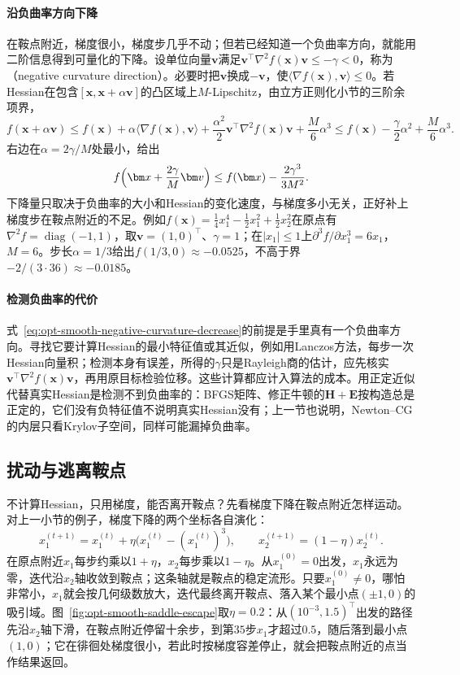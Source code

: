 \paragraph{沿负曲率方向下降}
在鞍点附近，梯度很小，梯度步几乎不动；但若已经知道一个负曲率方向，就能用二阶信息得到可量化的下降。设单位向量$\bm v$满足$\bm v^\top\nabla^2f(\bm x)\bm v\leq-\gamma<0$，称为（negative curvature direction）。必要时把$\bm v$换成$-\bm v$，使$\langle\nabla f(\bm x),\bm v\rangle\leq0$。若Hessian在包含$[\bm x,\bm x+\alpha\bm v]$的凸区域上$M$-Lipschitz，由立方正则化小节的三阶余项界，
\[
  f(\bm x+\alpha\bm v)\leq f(\bm x)+\alpha\langle\nabla f(\bm x),\bm v\rangle+\frac{\alpha^2}2\bm v^\top\nabla^2f(\bm x)\bm v+\frac M6\alpha^3
  \leq f(\bm x)-\frac\gamma2\alpha^2+\frac M6\alpha^3 .
\]
右边在$\alpha=2\gamma/M$处最小，给出
\begin{equation}
\label{eq:opt-smooth-negative-curvature-decrease}
  f\Bigl(\bm x+\frac{2\gamma}M\bm v\Bigr)\leq f(\bm x)-\frac{2\gamma^3}{3M^2}.
\end{equation}
下降量只取决于负曲率的大小和Hessian的变化速度，与梯度多小无关，正好补上梯度步在鞍点附近的不足。例如$f(\bm x)=\tfrac14x_1^4-\tfrac12x_1^2+\tfrac12x_2^2$在原点有$\nabla^2f=\operatorname{diag}(-1,1)$，取$\bm v=(1,0)^\top$、$\gamma=1$；在$|x_1|\leq1$上$\partial^3f/\partial x_1^3=6x_1$，$M=6$。步长$\alpha=1/3$给出$f(1/3,0)\approx-0.0525$，不高于界$-2/(3\cdot36)\approx-0.0185$。

\paragraph{检测负曲率的代价}
式~\eqref{eq:opt-smooth-negative-curvature-decrease}的前提是手里真有一个负曲率方向。寻找它要计算Hessian的最小特征值或其近似，例如用Lanczos方法，每步一次Hessian向量积；检测本身有误差，所得的$\gamma$只是Rayleigh商的估计，应先核实$\bm v^\top\nabla^2f(\bm x)\bm v$，再用原目标检验位移。这些计算都应计入算法的成本。用正定近似代替真实Hessian是检测不到负曲率的：BFGS矩阵、修正牛顿的$\bm H+\bm E$按构造总是正定的，它们没有负特征值不说明真实Hessian没有；上一节也说明，Newton--CG的内层只看Krylov子空间，同样可能漏掉负曲率。

\subsection{扰动与逃离鞍点}
\label{sec:opt-smooth-perturbed}

不计算Hessian，只用梯度，能否离开鞍点？先看梯度下降在鞍点附近怎样运动。对上一小节的例子，梯度下降的两个坐标各自演化：
\[
  x_1^{(t+1)}=x_1^{(t)}+\eta\bigl(x_1^{(t)}-(x_1^{(t)})^3\bigr),\qquad x_2^{(t+1)}=(1-\eta)x_2^{(t)} .
\]
在原点附近$x_1$每步约乘以$1+\eta$，$x_2$每步乘以$1-\eta$。从$x_1^{(0)}=0$出发，$x_1$永远为零，迭代沿$x_2$轴收敛到鞍点；这条轴就是鞍点的稳定流形。只要$x_1^{(0)}\neq0$，哪怕非常小，$x_1$就会按几何级数放大，迭代最终离开鞍点、落入某个最小点$(\pm1,0)$的吸引域。图~\ref{fig:opt-smooth-saddle-escape}取$\eta=0.2$：从$(10^{-3},1.5)^\top$出发的路径先沿$x_2$轴下滑，在鞍点附近停留十余步，到第$35$步$x_1$才超过$0.5$，随后落到最小点$(1,0)$；它在徘徊处梯度很小，若此时按梯度容差停止，就会把鞍点附近的点当作结果返回。


